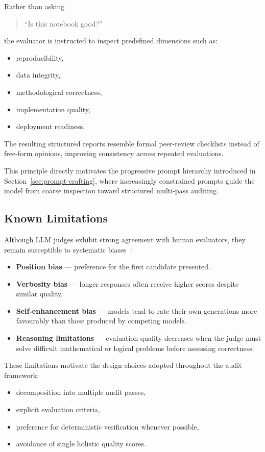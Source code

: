 \documentclass[11pt, a4paper]{article}
\begin{document}
Rather than asking

\begin{quote}
  ``Is this notebook good?''
\end{quote}

the evaluator is instructed to inspect predefined dimensions such as:
\begin{itemize}
  \item reproducibility,
  \item data integrity,
  \item methodological correctness,
  \item implementation quality,
  \item deployment readiness.
\end{itemize}

The resulting structured reports resemble formal peer-review checklists
instead of free-form opinions, improving consistency across repeated
evaluations.

This principle directly motivates the progressive prompt hierarchy introduced
in Section~\ref{sec:prompt-crafting}, where increasingly constrained prompts
guide the model from coarse inspection toward structured multi-pass auditing.

\subsection{Known Limitations}

Although LLM judges exhibit strong agreement with human evaluators, they
remain susceptible to systematic biases~\cite{wang2024bias,zhang2024evalbias}:

\begin{itemize}
  \item \textbf{Position bias} --- preference for the first candidate
    presented.
  \item \textbf{Verbosity bias} --- longer responses often receive higher
    scores despite similar quality.
  \item \textbf{Self-enhancement bias} --- models tend to rate their own
    generations more favourably than those produced by competing models.
  \item \textbf{Reasoning limitations} --- evaluation quality decreases when
    the judge must solve difficult mathematical or logical problems before
    assessing correctness.
\end{itemize}

These limitations motivate the design choices adopted throughout the audit
framework:
\begin{itemize}
  \item decomposition into multiple audit passes,
  \item explicit evaluation criteria,
  \item preference for deterministic verification whenever possible,
  \item avoidance of single holistic quality scores.
\end{itemize}
\end{document}
